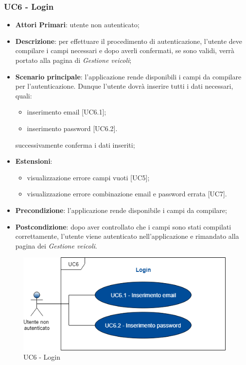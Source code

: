\subsubsection{UC6 - Login}
\begin{itemize}
	\item \textbf{Attori Primari}: utente non autenticato;
	\item \textbf{Descrizione}: per effettuare il procedimento di autenticazione, l'utente deve compilare i campi necessari e dopo averli confermati, se sono validi, verrà portato alla pagina di \textit{Gestione veicoli};
	\item \textbf{Scenario principale}: l'applicazione rende disponibili i campi da compilare per l'autenticazione. Dunque l'utente dovrà inserire tutti i dati necessari, quali:
	\begin{itemize}
		\item inserimento email [UC6.1];
		\item inserimento password [UC6.2].
	\end{itemize}
	successivamente conferma i dati inseriti;
	\item \textbf{Estensioni}:
	\begin{itemize}
		\item visualizzazione errore campi vuoti [UC5];
		\item visualizzazione errore combinazione email e password errata [UC7].
	\end{itemize}
	\item \textbf{Precondizione}: l'applicazione rende disponibile i campi da compilare;
	\item \textbf{Postcondizione}: dopo aver controllato che i campi sono stati compilati correttamente, l'utente viene autenticato nell'applicazione e rimandato alla pagina dei \textit{Gestione veicoli}.	
\end{itemize}
\begin{figure}[h]
	\includegraphics[width=11cm]{res/images/UC6Login.png}
	\centering
	\caption{UC6 - Login}
\end{figure}
